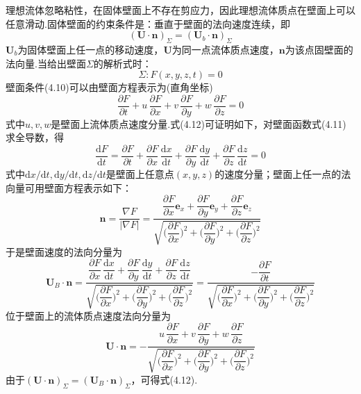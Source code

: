 理想流体忽略粘性，在固体壁面上不存在剪应力，因此理想流体质点在壁面上可以任意滑动.固体壁面的约束条件是：垂直于壁面的法向速度连续，即
\begin{equation*}
(\boldsymbol{U}\cdot\boldsymbol{n})_\Sigma=(\boldsymbol{U}_b\cdot\boldsymbol{n})_\Sigma
\tag{4.10}
\end{equation*}
$\boldsymbol{U}_b$为固体壁面上任一点的移动速度，$\boldsymbol{U}$为同一点流体质点速度，$\boldsymbol{n}$为该点固壁面的法向量.当给出壁面$\Sigma$的解析式时：
\begin{equation*}
\Sigma:F(x,y,z,t)=0
\tag{4.11}
\end{equation*}
壁面条件(4.10)可以由壁面方程表示为(直角坐标)
\begin{equation*}
\frac{\partial F}{\partial t}+u\,\frac{\partial F}{\partial x}+v\,\frac{\partial F}{\partial y}+w\,\frac{\partial F}{\partial z}=0
\tag{4.12}
\end{equation*}
式中$u,v,w$是壁面上流体质点速度分量.式(4.12)可证明如下，对壁面函数式(4.11)求全导数，得
\[
\frac{\mathrm{d}F}{\mathrm{d}t}=\frac{\partial F}{\partial t}+\frac{\partial F}{\partial x}\,\frac{\mathrm{d}x}{\mathrm{d}t}+\frac{\partial F}{\partial y}\,\frac{\mathrm{d}y}{\mathrm{d}t}+\frac{\partial F}{\partial z}\,\frac{\mathrm{d}z}{\mathrm{d}t}=0
\]
式中$\mathrm{d}x/\mathrm{d}t,\mathrm{d}y/\mathrm{d}t,\mathrm{d}z/\mathrm{d}t$是壁面上任意点$(x,y,z)$的速度分量；壁面上任一点的法向量可用壁面方程表示如下：
\begin{equation*}
\boldsymbol{n}=\frac{\nabla F}{|\nabla F|}=\frac{\dfrac{\partial F}{\partial x}\boldsymbol{e}_x+\dfrac{\partial F}{\partial y}\boldsymbol{e}_y+\dfrac{\partial F}{\partial z}\boldsymbol{e}_z}{\sqrt{\Big(\dfrac{\partial F}{\partial x}\Big)^{2}+\Big(\dfrac{\partial F}{\partial y}\Big)^{2}+\Big(\dfrac{\partial F}{\partial z}\Big)^{2}}}
\tag{4.13}
\end{equation*}
于是壁面速度的法向分量为
\[
\boldsymbol{U}_B\cdot\boldsymbol{n}=\frac{\dfrac{\partial F}{\partial x}\,\dfrac{\mathrm{d}x}{\mathrm{d}t}+\dfrac{\partial F}{\partial y}\,\dfrac{\mathrm{d}y}{\mathrm{d}t}+\dfrac{\partial F}{\partial z}\,\dfrac{\mathrm{d}z}{\mathrm{d}t}}{\sqrt{\Big(\dfrac{\partial F}{\partial x}\Big)^{2}+\Big(\dfrac{\partial F}{\partial y}\Big)^{2}+\Big(\dfrac{\partial F}{\partial z}\Big)^{2}}}=\frac{-\dfrac{\partial F}{\partial t}}{\sqrt{\Big(\dfrac{\partial F}{\partial x}\Big)^{2}+\Big(\dfrac{\partial F}{\partial y}\Big)^{2}+\Big(\dfrac{\partial F}{\partial z}\Big)^{2}}}
\]
位于壁面上的流体质点速度法向分量为
\[
\boldsymbol{U}\cdot\boldsymbol{n}=-\frac{u\,\dfrac{\partial F}{\partial x}+v\,\dfrac{\partial F}{\partial y}+w\,\dfrac{\partial F}{\partial z}}{\sqrt{\Big(\dfrac{\partial F}{\partial x}\Big)^{2}+\Big(\dfrac{\partial F}{\partial y}\Big)^{2}+\Big(\dfrac{\partial F}{\partial z}\Big)^{2}}}
\]
由于$(\boldsymbol{U}\cdot\boldsymbol{n})_\Sigma=(\boldsymbol{U}_B\cdot\boldsymbol{n})_\Sigma$，可得式(4.12).

